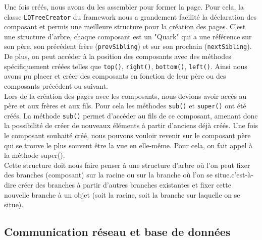 \documentclass[twoside]{report}
\begin{document}
Une fois créés, nous avons du les assembler pour former la page. Pour cela, la classe \verb!LQTreeCreator! du framework nous a grandement facilité la déclaration des composant et permis une meilleure structure pour la création des pages. C'est une structure d'arbre, chaque composant est un "Quark" qui a une référence sur son père, son précédent frère (\verb!prevSibling!) et sur son prochain (\verb!nextSibling!). 
De plus, on peut accéder à la position des composants avec des méthodes spécifiquement créées telles que \verb!top()!, \verb!right()!, \verb!bottom()!, \verb!left()!. Ainsi nous avons pu placer et créer des composants en fonction de leur père ou des composants précédent ou suivant. \\
Lors de la création des pages avec les composants, nous devions avoir accès au père et aux frères et aux fils. Pour cela les méthodes \verb!sub()! et \verb!super()! ont été créés. La méthode \verb!sub()! permet d'accéder au fils de ce composant, amenant donc la possibilité de créer de nouveaux éléments à partir d'anciens déjà créés.
Une fois le composant souhaité créé, nous pouvons vouloir revenir sur le composant père qui se trouve le plus souvent être la vue en elle-même. Pour cela, on fait appel à la méthode super().\\
Cette structure doit nous faire penser à une structure d'arbre où l'on peut fixer des branches (composant) sur la racine ou sur la branche où l'on se situe.c'est-à-dire créer des branches à partir d'autres branches existantes et fixer cette nouvelle branche à un objet (soit la racine, soit la branche sur laquelle on se situe). 

\subsection{Communication réseau et base de données}
\end{document}
